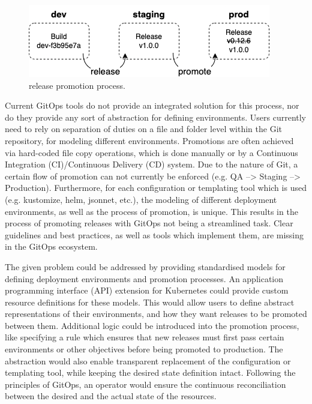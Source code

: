\begin{figure}[h]
	\centering
	\includegraphics[width=.55\linewidth]{figures/release-promotion.drawio.png}
	\caption{release promotion process.
	}
	\label{fig:releasePromotionProcess}	
\end{figure}

\noindent
Current GitOps tools do not provide an integrated solution for this process,
nor do they provide any sort of abstraction for defining environments.
Users currently need to rely on separation of duties
on a file and folder level within the Git repository,
for modeling different environments.
Promotions are often achieved via hard-coded file copy operations,
which is done manually or by a
Continuous Integration (CI)/Continuous Delivery (CD) system.
Due to the nature of Git, a certain flow of promotion can not currently be enforced
(e.g. QA --> Staging --> Production).
Furthermore, for each configuration or templating tool which is used
(e.g. kustomize, helm, jsonnet, etc.),
the modeling of different deployment environments, as well as the
process of promotion, is unique.
This results in the process of promoting releases with GitOps
not being a streamlined task.
Clear guidelines and best practices,
as well as tools which implement them,
are missing in the GitOps ecosystem.
\bigskip


\noindent
%
The given problem could be addressed by
providing standardised models 
for defining deployment environments and promotion processes.
%
An application programming interface (API) extension for Kubernetes
could provide custom resource definitions for these models.
%
This would allow users to define abstract representations of
their environments,
and how they want releases to be promoted between them.
%
Additional logic could be introduced into the promotion process,
like specifying a rule which ensures that new releases must first pass
certain environments or other objectives before being promoted to production.
%
The abstraction would also enable transparent replacement of the
configuration or templating tool,
while keeping the desired state definition intact.
%
Following the principles of GitOps,
an operator would ensure the continuous reconciliation
between the desired and the actual state of the resources.
\bigskip

